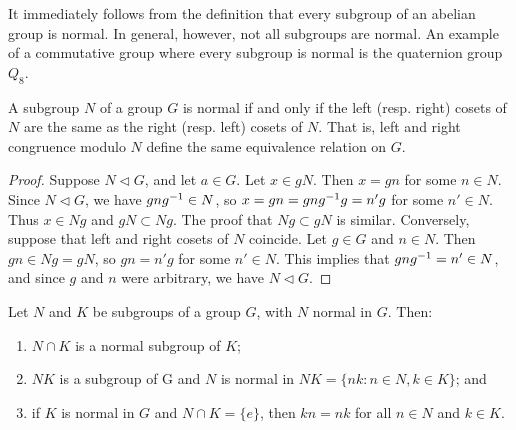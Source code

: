\begin{example}
    It immediately follows from the definition that every subgroup of an abelian
    group is normal. In general, however, not all subgroups are normal. An
    example of a commutative group where every subgroup is normal is the
    quaternion group \(Q_8\).
\end{example}

\begin{theorem}
    A subgroup \(N\) of a group \(G\) is normal if and only if the left (resp.
    right) cosets of \(N\) are the same as the right (resp. left) cosets of
    \(N\). That is, left and right congruence modulo \(N\) define the same
    equivalence relation on \(G\).
\end{theorem}

\begin{proof}
    Suppose \(N \triangleleft G\), and let \(a \in G\). Let \(x \in gN\). Then
    \(x = gn\) for some \(n \in N\). Since \(N \triangleleft G\), we have
    \(gng^{-1} \in N\), so \(x = gn = gng^{-1} g = n'g\) for some \(n' \in N\).
    Thus \(x \in Ng\) and \(gN \subset Ng\). The proof that \(Ng \subset gN\) is
    similar. Conversely, suppose that left and right cosets of \(N\) coincide.
    Let \(g \in G\) and \(n \in N\). Then \(gn \in Ng = gN\), so \(gn = n'g\)
    for some \(n' \in N\). This implies that \(gng^{-1} = n' \in N\), and since
    \(g\) and \(n\) were arbitrary, we have \(N \triangleleft G\).
\end{proof}

\begin{theorem}
    \label{thm:normal-subgroup-props}
    Let \(N\) and \(K\) be subgroups of a group \(G\), with \(N\) normal in
    \(G\). Then:
    \begin{enumerate}[label=(\alph*)]
        \item \(N \cap K\) is a normal subgroup of \(K\);
        \item \(NK\) is a subgroup of G and \(N\) is normal in \(NK = \{nk : n
        \in N, k \in K\}\); and
        \item if \(K\) is normal in \(G\) and \(N \cap K = \{e\}\), then \(kn =
        nk\) for all \(n \in N\) and \(k \in K\).
    \end{enumerate}
\end{theorem}

